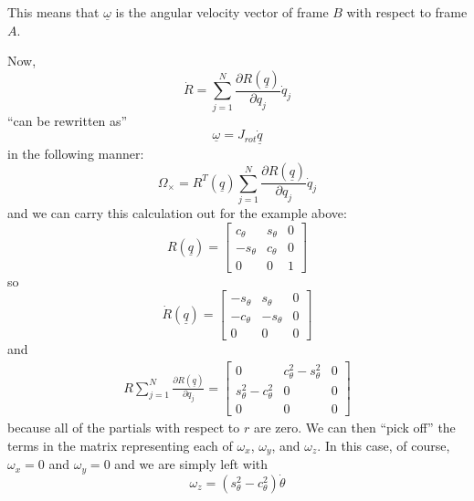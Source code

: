 \documentclass[]{article}
\begin{document}
This means that $\underline{\omega}$ is the angular velocity vector of frame $B$ with respect to frame $A$.

Now,
\begin{displaymath}
\dot{R} = \sum_{j=1}^{N} \frac{\partial R(\underline{q})}{\partial q_{j}}\dot{q}_{j}
\end{displaymath}
``can be rewritten as''
\begin{displaymath}
	\underline{\omega}=J_{rot}\dot{\underline{q}}
\end{displaymath}
in the following manner:
\begin{displaymath}
	\Omega_{\times} = R^{T}(\underline{q})\sum_{j=1}^{N}\frac{\partial R(\underline{q})}{\partial q_{j}}\dot{q}_{j}
\end{displaymath}
and we can carry this calculation out for the example above:
\begin{displaymath}
	R(\underline{q}) = \left[\begin{array}{ccc} c_{\theta} & s_{\theta} & 0 \\ -s_{\theta} & c_{\theta} & 0 \\ 0 & 0 & 1 \end{array}\right]
\end{displaymath}
so
\begin{displaymath}
	\dot{R}(\underline{q}) = \left[\begin{array}{ccc} -s_{\theta} & s_{\theta} & 0 \\ -c_{\theta} & -s_{\theta} & 0 \\ 0 & 0 & 0 \end{array}\right]
\end{displaymath}
and
\begin{eqnarray}
R\sum_{j=1}^{N}\frac{\partial R(\underline{q})}{\partial q_{j}} = \left[ \begin{array}{ccc}  0 & c_{\theta}^{2}-s_{\theta}^{2} & 0 \\ s_{\theta}^{2}-c_{\theta}^{2} & 0 & 0 \\ 0 & 0 & 0 \end{array}\right]
\end{eqnarray}
because all of the partials with respect to $r$ are zero. We can then ``pick off'' the terms in the matrix representing each of $\omega_{x}$, $\omega_{y}$, and $\omega_{z}$. In this case, of course, $\omega_{x}=0$ and $\omega_{y}=0$ and we are simply left with
\begin{displaymath}
	\omega_{z} = (s_{\theta}^{2}-c_{\theta}^{2})\dot{\theta}
\end{displaymath}
\end{document}
